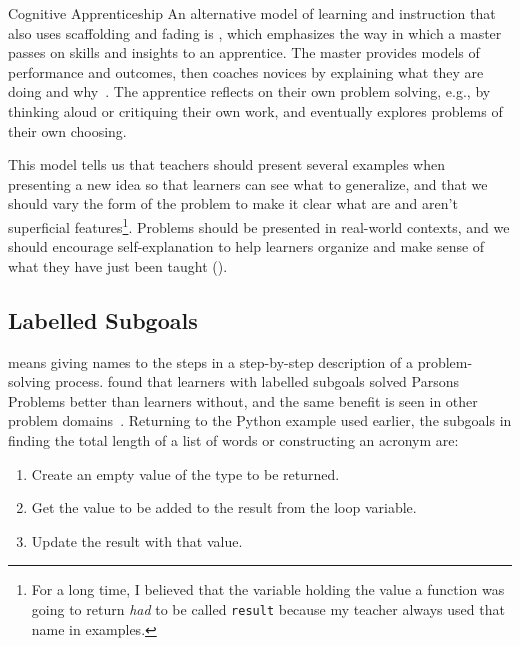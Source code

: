 \begin{aside}{Cognitive Apprenticeship}
  An alternative model of learning and instruction that also uses scaffolding and fading
  is ,
  which emphasizes the way in which a master passes on skills and insights to an apprentice.
  The master provides models of performance and outcomes,
  then coaches novices by explaining what they are doing and why~\cite{Coll1991,Casp2007}.
  The apprentice reflects on their own problem solving,
  e.g.,
  by thinking aloud or critiquing their own work,
  and eventually explores problems of their own choosing.

  This model tells us that
  teachers should present several examples when presenting a new idea
  so that learners can see what to generalize,
  and that we should vary the form of the problem to make it clear what are and aren't superficial features\footnote{For a long time,
    I believed that the variable holding the value a function was going to return \emph{had} to be called \texttt{result}
    because my teacher always used that name in examples.}.
  Problems should be presented in real-world contexts,
  and we should encourage self-explanation to help learners organize and make sense of what they have just been taught
  ().
\end{aside}

\subsection*{Labelled Subgoals}

 means
giving names to the steps in a step-by-step description of a problem-solving process.
\cite{Marg2016,Morr2016} found that learners with labelled subgoals solved Parsons Problems better than learners without,
and the same benefit is seen in other problem domains~\cite{Marg2012}.
Returning to the Python example used earlier,
the subgoals in finding the total length of a list of words or constructing an acronym are:

\begin{enumerate}

\item
  Create an empty value of the type to be returned.

\item
  Get the value to be added to the result from the loop variable.

\item
  Update the result with that value.

\end{enumerate}

